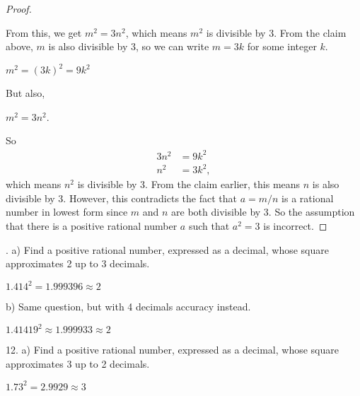 \documentclass[12pt]{article}
\begin{document}
\begin{proof}
\begin{center}
\end{center}
From this, we get $m^2=3n^2$, which means $m^2$ is divisible by 3. From the claim above, $m$ is also divisible by 3, so we can write $m=3k$ for some integer $k$.
\begin{center}
$m^2=(3k)^2=9k^2$
\end{center}
But also,
\begin{center}
$m^2=3n^2$.
\end{center}
So
\begin{align*}
3n^2&=9k^2 \\
n^2&=3k^2,
\end{align*}
which means $n^2$ is divisible by 3. From the claim earlier, this means $n$ is also divisible by 3. However, this contradicts the fact that $a=m/n$ is a rational number in lowest form since $m$ and $n$ are both divisible by 3. So the assumption that there is a positive rational number $a$ such that $a^2=3$ is incorrect.
\end{proof}
. a) Find a positive rational number, expressed as a decimal, whose square approximates 2 up to 3 decimals.
\begin{center}
$1.414^2=1.999396\approx2$
\end{center}

b) Same question, but with 4 decimals accuracy instead.
\begin{center}
$1.41419^2\approx1.999933\approx2$
\end{center}
12. a) Find a positive rational number, expressed as a decimal, whose square approximates 3 up to 2 decimals.
\begin{center}
$1.73^2=2.9929\approx3$
\end{center}
\end{document}

